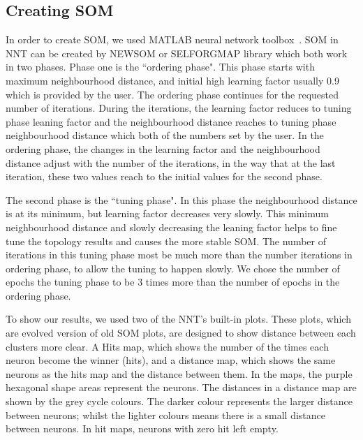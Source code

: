 \subsection{Creating SOM}
\label{sec: create_som}
     In order to create SOM, we used {\tiny MATLAB} neural network 
     toolbox~\citep[NNT,][]{matlabtolbox}.
     SOM in {\tiny NNT} can be created by {\tiny NEWSOM} or {\tiny SELFORGMAP} library which both work in two phases. 
     Phase one is the ``ordering phase". 
     This phase starts with maximum neighbourhood distance, and initial high learning factor usually 0.9 which is provided by the user. 
     The ordering phase continues for the requested number of iterations.
     During the iterations, the learning factor reduces to tuning phase leaning factor and the neighbourhood distance reaches to tuning phase neighbourhood distance which both of the numbers set by the user.
     In the ordering phase, the changes in the learning factor and the neighbourhood distance adjust with the number of the iterations, in the way that at the last iteration, these two values reach to the initial values for the second phase.
     
     The second phase is the ``tuning phase".
     In this phase the neighbourhood distance is at its minimum, but learning factor decreases very slowly.
     This minimum neighbourhood distance and slowly decreasing the leaning factor helps to fine tune the topology results and causes the more stable SOM. 
     The number of iterations in this tuning phase most be much more than the number iterations in ordering phase, to allow the tuning to happen slowly. %
     We chose the number of epochs the tuning phase to be 3 times more than the number of epochs in the ordering phase.
     
     To show our results, we used two of the {\tiny NNT}'s built-in plots.
     These plots, which are evolved version of old SOM plots, are designed to show distance between each clusters more clear.
     A Hits map, which shows the number of the times each neuron become the winner (hits), and a distance map, which shows the same neurons as the hits map and the distance between them.
     In the maps, the purple hexagonal shape areas represent the neurons.
     The distances in a distance map are shown by the grey cycle colours.
     The darker colour represents the larger distance between neurons; whilst the lighter colours means there is a small distance between neurons.
     In hit maps, neurons with zero hit left empty.
      

